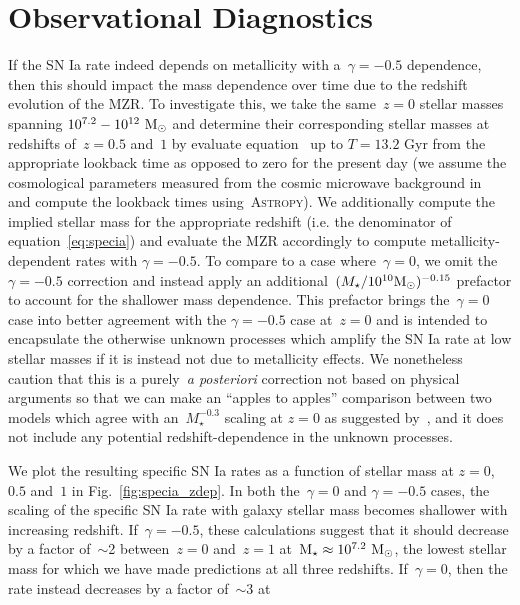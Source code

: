 \documentclass[ms.tex]{subfiles}
\begin{document}
\section{Observational Diagnostics}
\label{sec:diagnostics}

If the SN Ia rate indeed depends on metallicity with a~$\gamma = -0.5$
dependence, then this should impact the mass dependence over time due to the
redshift evolution of the MZR.
To investigate this, we take the same~$z = 0$ stellar masses spanning
$10^{7.2} - 10^{12}~\text{M}_\odot$ and determine their corresponding stellar masses
at redshifts of~$z = 0.5$ and~$1$ by evaluate equation~ up to
$T = 13.2$ Gyr from the appropriate lookback time as opposed to zero for the
present day (we assume the cosmological parameters measured from the cosmic
microwave background in~\citealt{Planck2014} and compute the lookback times
using~\textsc{Astropy}).
We additionally compute the implied stellar mass for the appropriate redshift
(i.e. the denominator of equation~\ref{eq:specia}) and evaluate the
\citet{Zahid2014} MZR accordingly to compute metallicity-dependent rates with
$\gamma = -0.5$.
To compare to a case where~$\gamma = 0$, we omit the~$\gamma = -0.5$ correction
and instead apply an additional~$(M_\star / 10^{10} \text{M}_\odot)^{-0.15}$
prefactor to account for the shallower mass dependence.
This prefactor brings the~$\gamma = 0$ case into better agreement with the
$\gamma = -0.5$ case at~$z = 0$ and is intended to encapsulate the otherwise
unknown processes which amplify the SN Ia rate at low stellar masses if it is
instead not due to metallicity effects.
We nonetheless caution that this is a purely~\textit{a posteriori} correction
not based on physical arguments so that we can make an ``apples to apples''
comparison between two models which agree with an~$M_\star^{-0.3}$ scaling at
$z = 0$ as suggested by~\citet{Gandhi2022}, and it does not include any
potential redshift-dependence in the unknown processes.
\par
We plot the resulting specific SN Ia rates as a function of stellar mass at
$z = 0$,~$0.5$ and~$1$ in Fig.~\ref{fig:specia_zdep}.
In both the~$\gamma = 0$ and $\gamma = -0.5$ cases, the scaling of the specific
SN Ia rate with galaxy stellar mass becomes shallower with increasing redshift.
If~$\gamma = -0.5$, these calculations suggest that it should decrease by a
factor of~$\sim$2 between~$z = 0$ and~$z = 1$ at~$\text{M}_\star \approx
10^{7.2}~\text{M}_\odot$, the lowest stellar mass for which we have made predictions at
all three redshifts.
If~$\gamma = 0$, then the rate instead decreases by a factor of~$\sim$3 at
\end{document}

